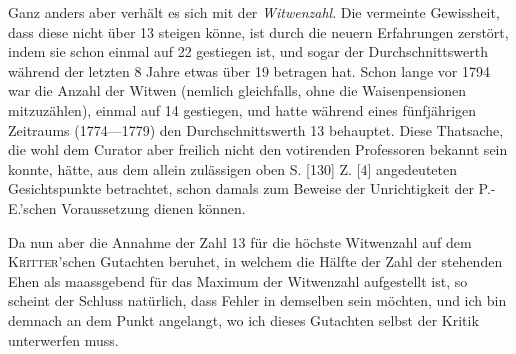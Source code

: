 Ganz anders aber verhält es sich mit der \textit{Witwenzahl}. Die vermeinte Gewissheit, dass diese nicht über 13 steigen könne, ist durch die neuern Erfahrungen zerstört, indem sie schon einmal auf 22 gestiegen ist, und sogar der Durchschnittswerth während der letzten 8 Jahre etwas über 19 betragen hat. Schon lange vor 1794 war die Anzahl der Witwen (nemlich gleichfalls, ohne die Waisenpensionen mitzuzählen), einmal auf 14 gestiegen, und hatte während eines fünfjährigen Zeitraums (1774—1779) den Durchschnittswerth 13 behauptet. Diese Thatsache, die wohl dem Curator aber freilich nicht den votirenden Professoren bekannt sein konnte, hätte, aus dem allein zulässigen oben S. [130] Z. [4] angedeuteten Gesichtspunkte betrachtet, schon damals zum Beweise der Unrichtigkeit der P.-E.’schen Voraussetzung dienen können.

Da nun aber die Annahme der Zahl 13 für die höchste Witwenzahl auf dem \textsc{Kritter}’schen Gutachten beruhet, in welchem die Hälfte der Zahl der stehenden Ehen als maassgebend für das Maximum der Witwenzahl aufgestellt ist, so scheint der Schluss natürlich, dass Fehler in demselben sein möchten, und ich bin demnach an dem Punkt angelangt, wo ich dieses Gutachten selbst der Kritik unterwerfen muss.
